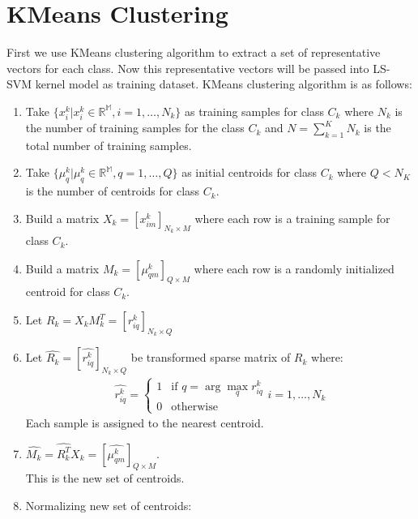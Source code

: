 \documentclass[conference]{IEEEtran}
\begin{document}


    \section{KMeans Clustering}\label{sec:kmeans-clustering}
    First we use KMeans clustering algorithm to extract a set of representative vectors for each class.
    Now this representative vectors will be passed into LS-SVM kernel model as training dataset.
    KMeans clustering algorithm is as follows:
    \begin{enumerate}
        \item Take $\{x_{i}^{k}|x_{i}^{k} \in \mathbb{R^{M}}, i=1,\ldots,N_{k}\}$ as training samples for class $C_{k}$ where
        $N_{k}$ is the number of training samples for the class $C_{k}$ and $N = \sum_{k=1}^{K}N_{k}$ is the total
        number of training samples.
        \item Take $\{\mu_{q}^{k}|\mu_{q}^{k} \in \mathbb{R^{M}}, q=1,\ldots,Q \}$ as initial centroids
        for class $C_{k}$ where $Q<N_{K}$ is the number of centroids for class $C_{k}$.
        \item Build a matrix $X_{k} = [x_{im}^{k}]_{N_{k} \times M}$ where each row is a training sample for class $C_{k}$.
        \item Build a matrix $M_{k} = [\mu_{qm}^{k}]_{Q \times M}$ where each row is a randomly initialized centroid
        for class $C_{k}$.
        \item Let $R_{k} = X_{k}M_{k}^{T} = [r_{iq}^{k}]_{N_{k}\times Q}$
        \item Let $\hat{R_{k}} = [\hat{r_{iq}^{k}}]_{N_{k}\times Q}$ be transformed sparse matrix of $R_{k}$ where:
        \begin{align*}
            \hat{r_{iq}^{k}} = \begin{cases}
                                   1 & \text{if } q = \arg \max_{q}r_{iq}^{k} \\
                                   0 & \text{otherwise}
            \end{cases}
            i = 1,\ldots,N_{k}
        \end{align*}
        Each sample is assigned to the nearest centroid.
        \item $\hat{M_{k}} = \hat{R_{k}^{T}}X_{k} = [\hat{\mu_{qm}^{k}}]_{Q \times M}$. \\
        This is the new set of centroids.
        \item Normalizing new set of centroids:

\end{enumerate}
\end{document}
